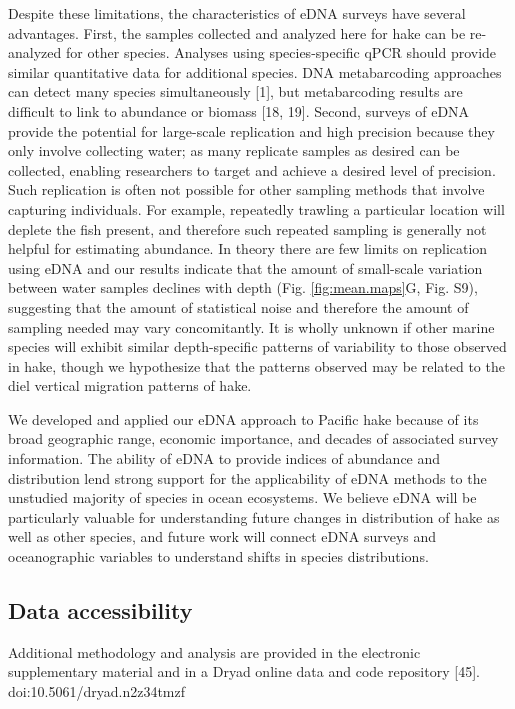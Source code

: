 \documentclass[
]{article}
\begin{document}
Despite these limitations, the characteristics of eDNA surveys have
several advantages. First, the samples collected and analyzed here for
hake can be re-analyzed for other species. Analyses using
species-specific qPCR should provide similar quantitative data for
additional species. DNA metabarcoding approaches can detect many species simultaneously {[}1{]}, 
but metabarcoding results are difficult to
link to abundance or biomass {[}18, 19{]}. Second, surveys of eDNA provide
the potential for large-scale replication and high precision because they only involve collecting water; as many
replicate samples as desired can be collected, enabling researchers to
target and achieve a desired level of precision. Such replication is often not
possible for other sampling methods that involve capturing individuals.
For example, repeatedly trawling a particular location will deplete the
fish present, and therefore such repeated sampling is generally not helpful for
estimating abundance. In theory there are few limits on replication
using eDNA and our results indicate that the amount of small-scale
variation between water samples declines with depth (Fig.
\ref{fig:mean.maps}G, Fig. S9), suggesting that the amount of
statistical noise and therefore the amount of sampling needed may vary
concomitantly. It is wholly unknown if other marine species will exhibit similar 
depth-specific patterns of variability to those observed in hake, though we 
hypothesize that the patterns observed may be related to the diel vertical migration patterns of hake.

We developed and applied our eDNA approach to Pacific hake because of
its broad geographic range, economic importance, and decades of
associated survey information. The ability of eDNA to provide indices 
of abundance and distribution lend strong
support for the applicability of eDNA methods to the unstudied majority
of species in ocean ecosystems. We believe eDNA will be particularly 
valuable for understanding future changes in distribution of hake as 
well as other species, and future work will connect eDNA surveys and 
oceanographic variables to understand shifts in species distributions. 


\hypertarget{Data accessibility}{%
\subsection{Data accessibility}\label{Data}}
Additional methodology and analysis are provided in
the electronic supplementary material and in a Dryad online data and code repository {[}45{]}.
doi:10.5061/dryad.n2z34tmzf
\end{document}
